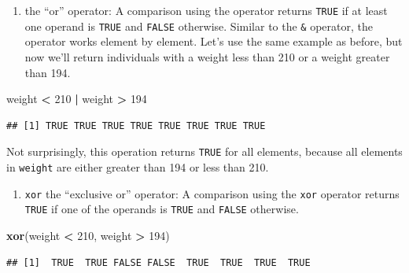 \documentclass[
]{krantz}
\newenvironment{Shaded}{\begin{snugshade}}{\end{snugshade}}
\newcommand{\DecValTok}[1]{\textcolor[rgb]{0.00,0.00,0.81}{#1}}
\newcommand{\KeywordTok}[1]{\textcolor[rgb]{0.13,0.29,0.53}{\textbf{#1}}}
\newcommand{\NormalTok}[1]{#1}
\newcommand{\OperatorTok}[1]{\textcolor[rgb]{0.81,0.36,0.00}{\textbf{#1}}}
\newcommand{\StringTok}[1]{\textcolor[rgb]{0.31,0.60,0.02}{#1}}
\providecommand{\tightlist}{%
  \setlength{\itemsep}{0pt}\setlength{\parskip}{0pt}}
\begin{document}
\begin{enumerate}
\def\labelenumi{\arabic{enumi}.}
\setcounter{enumi}{1}
\tightlist
\item
  \texttt{\textbar{}} the ``or'' operator: A comparison using the \texttt{\textbar{}} operator returns \texttt{TRUE} if at least one operand is \texttt{TRUE} and \texttt{FALSE} otherwise. Similar to the \texttt{\&} operator, the \texttt{\textbar{}} operator works element by element. Let's use the same example as before, but now we'll return individuals with a weight less than 210 or a weight greater than 194.
\end{enumerate}

\begin{Shaded}
\begin{Highlighting}[]
\NormalTok{weight }\OperatorTok{\textless{}}\StringTok{ }\DecValTok{210} \OperatorTok{|}\StringTok{ }\NormalTok{weight }\OperatorTok{\textgreater{}}\StringTok{ }\DecValTok{194}
\end{Highlighting}
\end{Shaded}

\begin{verbatim}
## [1] TRUE TRUE TRUE TRUE TRUE TRUE TRUE TRUE
\end{verbatim}

Not surprisingly, this operation returns \texttt{TRUE} for all elements, because all elements in \texttt{weight} are either greater than 194 or less than 210.

\begin{enumerate}
\def\labelenumi{\arabic{enumi}.}
\setcounter{enumi}{2}
\tightlist
\item
  \texttt{xor} the ``exclusive or'' operator: A comparison using the \texttt{xor} operator returns \texttt{TRUE} if one of the operands is \texttt{TRUE} and \texttt{FALSE} otherwise.
\end{enumerate}

\begin{Shaded}
\begin{Highlighting}[]
\KeywordTok{xor}\NormalTok{(weight }\OperatorTok{\textless{}}\StringTok{ }\DecValTok{210}\NormalTok{, weight }\OperatorTok{\textgreater{}}\StringTok{ }\DecValTok{194}\NormalTok{)}
\end{Highlighting}
\end{Shaded}

\begin{verbatim}
## [1]  TRUE  TRUE FALSE FALSE  TRUE  TRUE  TRUE  TRUE
\end{verbatim}
\end{document}
